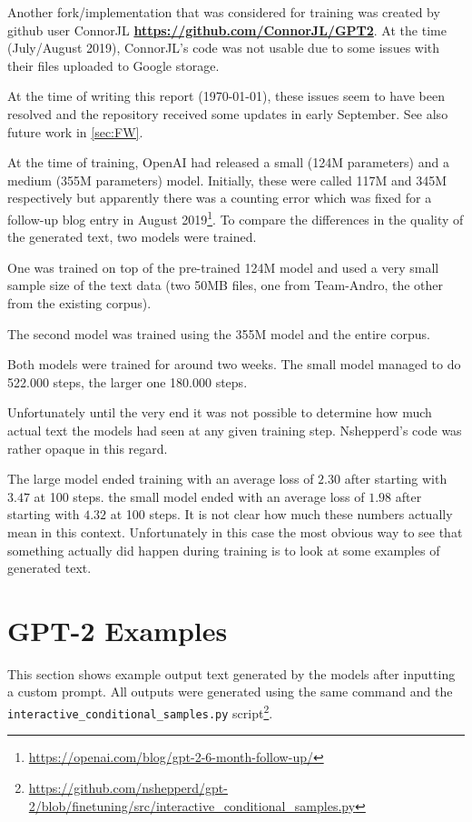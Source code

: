 \documentclass{scrartcl}
\newcommand{\burl}[1]{\textbf{\url{#1}}}
\begin{document}
Another fork/implementation that was considered for training was created by github user ConnorJL \burl{https://github.com/ConnorJL/GPT2}. At the time (July/August 2019), ConnorJL's code was not usable due to some issues with their files uploaded to Google storage.

At the time of writing this report (\today), these issues seem to have been resolved and the repository received some updates in early September. See  also future work in \cref{sec:FW}.


At the time of training, OpenAI had released a small (124M parameters) and a medium (355M parameters) model. Initially, these were called 117M and 345M respectively but apparently there was a counting error which was fixed for a follow-up blog entry in August 2019\footnote{\url{https://openai.com/blog/gpt-2-6-month-follow-up/}}.
To compare the differences in the quality of the generated text, two models were trained.

One was trained on top of the pre-trained 124M model and used a very small sample size of the text data (two 50MB files, one from Team-Andro, the other from the existing corpus).

The second model was trained using the 355M model and the entire corpus. 

Both models were trained for around two weeks. The small model managed to do 522.000 steps, the larger one 180.000 steps.

Unfortunately until the very end it was not possible to determine how much actual text the models had seen at any given training step. Nshepperd's code was rather opaque in this regard.

The large model ended training with an average loss of $ 2.30 $ after starting with $ 3.47 $ at 100 steps.
the small model ended with an average loss of $ 1.98 $ after starting with $ 4.32 $ at 100 steps.
It is not clear how much these numbers actually mean in this context. Unfortunately in this case the most obvious way to see that something actually did happen during training is to look at some examples of generated text.

\section{GPT-2 Examples}

This section shows example output text generated by the models after inputting a custom prompt. All outputs were generated using the same command and the \\ \texttt{interactive\_conditional\_samples.py} script\footnote{\url{https://github.com/nshepperd/gpt-2/blob/finetuning/src/interactive_conditional_samples.py}}.
\end{document}
